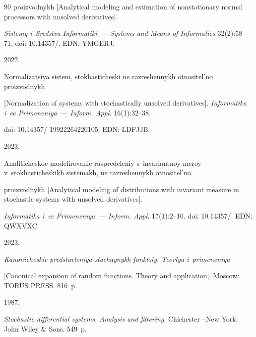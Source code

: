 {{\begin{thebibliography}{99}
proizvodnykh [Analytical modeling and estimation of nonstationary normal processors with unsolved derivatives]. 

\textit{Sistemy i~Sredstva Informatiki~--- Systems and Means of Informatics} 32(2):58--71. doi: 10.14357\!/. EDN: YMGERJ.





 2022.

Normalizatsiya sistem, stokhasticheski ne razreshennykh otnositel'no proizvodnykh 

[Normalization of systems with stochastically unsolved derivatives]. \textit{Informatika i~ee Primeneniya~--- Inform. Appl.} 16(1):32--38.

doi: 10.14357\!/ 19922264220105. EDN: LDFJJB.





 2023. 

Analiticheskoe modelirovanie raspredeleniy s~invariantnoy meroy v~stokhasticheskikh sistemakh, ne razreshennykh otnositel'no 

proizvodnykh [Analytical modeling of distributions with invariant measure in stochastic systems with unsolved derivatives]. 

\textit{Informatika i~ee Primeneniya~--- Inform. Appl.}  17(1):2--10. doi: 10.14357\!/. EDN: QWXVXC.





 2023.

\textit{Kanonicheskie predstavleniya sluchaynykh funktsiy. Teoriya i~primeneniya} 

[Canonical expansion of random functions. Theory and application]. Moscow: TORUS PRESS. 816~p.





 1987. 

\textit{Stochastic differential systems. Analysis and filtering}. Chichester\,--\,New York: John Wiley \& Sons. 549~p.







\end{thebibliography}}}
